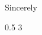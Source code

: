 \documentclass[letterpaper, 10pt]{article}
\begin{document}
\makeheader


\blindtext

\blindtext

\closing{Sincerely}{0.5 \baselineskip}{3 \baselineskip}

\makefooter
\end{document}
